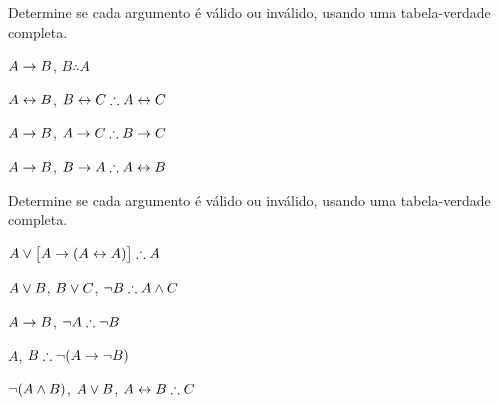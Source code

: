 \noindent\problempart
\label{pr.TT.valid2}
Determine se cada argumento é válido ou inválido, usando uma tabela-verdade completa.
\begin{compactlist}
\item $A\rightarrow B$, $B \therefore  A$ %

\item $A\leftrightarrow B$, $B\eiff C \therefore A\eiff C$ %

\item $A \rightarrow B$, $A \eif C\therefore B \eif C$ %

\item $A \rightarrow B$, $B \eif A\therefore A \eiff B$ %

\end{compactlist}

\noindent\problempart
\label{pr.TT.valid3}
Determine se cada argumento é válido ou inválido, usando uma tabela-verdade completa.
\begin{compactlist}
\item $A\eor\bigl[A\eif(A\eiff A)\bigr] \therefore  A $\vspace{.5ex}%
\item $A\vee B$, $B\vee C$, $\enot B \therefore A \eand C$\vspace{.5ex} %
\item $A \rightarrow B$, $\enot A\therefore \enot B$ \vspace{.5ex}%
\item $A$, $B\therefore \enot(A\eif \enot B)$ \vspace{.5ex}%
\item $\neg(A \wedge B)$, $A \vee B$, $A \eiff B\therefore C$ \vspace{.5ex}%
\end{compactlist}

